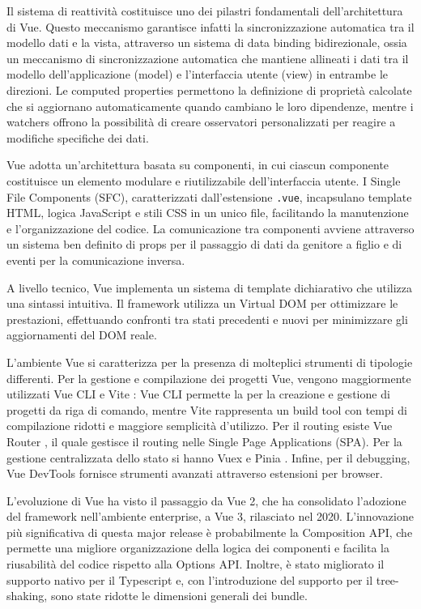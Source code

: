 Il sistema di reattività costituisce uno dei pilastri fondamentali dell'architettura di Vue. Questo meccanismo garantisce infatti la sincronizzazione automatica tra il modello dati e la vista, attraverso un sistema di data binding bidirezionale, ossia un meccanismo di sincronizzazione automatica che mantiene allineati i dati tra il modello dell'applicazione (model) e l'interfaccia utente (view) in entrambe le direzioni. Le computed properties permettono la definizione di proprietà calcolate che si aggiornano automaticamente quando cambiano le loro dipendenze, mentre i watchers offrono la possibilità di creare osservatori personalizzati per reagire a modifiche specifiche dei dati.

Vue adotta un'architettura basata su componenti, in cui ciascun componente costituisce un elemento modulare e riutilizzabile dell'interfaccia utente. I Single File Components (SFC), caratterizzati dall'estensione \texttt{.vue}, incapsulano template HTML, logica JavaScript e stili CSS in un unico file, facilitando la manutenzione e l'organizzazione del codice. La comunicazione tra componenti avviene attraverso un sistema ben definito di props per il passaggio di dati da genitore a figlio e di eventi per la comunicazione inversa.

A livello tecnico, Vue implementa un sistema di template dichiarativo che utilizza una sintassi intuitiva. Il framework utilizza un Virtual DOM per ottimizzare le prestazioni, effettuando confronti tra stati precedenti e nuovi per minimizzare gli aggiornamenti del DOM reale.

L'ambiente Vue si caratterizza per la presenza di molteplici strumenti di tipologie differenti. Per la gestione e compilazione dei progetti Vue, vengono maggiormente utilizzati Vue CLI \cite{vuecli2018} e Vite \cite{vite2021}: Vue CLI permette la per la creazione e gestione di progetti da riga di comando, mentre Vite rappresenta un build tool con tempi di compilazione ridotti e maggiore semplicità d'utilizzo. Per il routing esiste Vue Router \cite{vuerouter2016}, il quale gestisce il routing nelle Single Page Applications (SPA). Per la gestione centralizzata dello stato si hanno Vuex \cite{vuex2016} e Pinia \cite{pinia2021}. Infine, per il debugging, Vue DevTools \cite{vuedevtools2016} fornisce strumenti avanzati attraverso estensioni per browser.

L'evoluzione di Vue ha visto il passaggio da Vue 2, che ha consolidato l'adozione del framework nell'ambiente enterprise, a Vue 3, rilasciato nel 2020. L'innovazione più significativa di questa major release è probabilmente la Composition API, che permette una migliore organizzazione della logica dei componenti e facilita la riusabilità del codice rispetto alla Options API. Inoltre, è stato migliorato il supporto nativo per il Typescript e, con l'introduzione del supporto per il tree-shaking, sono state ridotte le dimensioni generali dei bundle.

